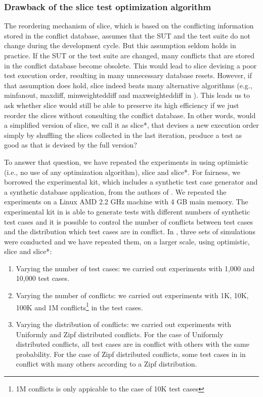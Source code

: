 \documentclass[authoryear,preprint,12pt]{elsarticle}
\begin{document}
  \subsubsection{Drawback of the {\sc slice} test optimization algorithm}
  \label{drawbackslice}

The reordering mechanism of {\sc slice}, which is based on the 
conflicting information stored in the conflict database, 
assumes that the SUT and the test suite do not change during the development cycle.
But this assumption seldom holds in practice.
If the SUT or the test suite are changed, 
many conflicts that are stored in the conflict database become obsolete.
This would lead to {\sc slice} devising a poor test execution order,
resulting in many unnecessary database resets.
However, if that assumption does hold,
{\sc slice} indeed beats many alternative algorithms (e.g., {\sc minfanout}, {\sc maxdiff}, {\sc minweighteddiff} and {\sc maxweighteddiff} in \cite{cidr05}).
This leads us to ask whether {\sc slice} would still be able to preserve its high efficiency if we just reorder the slices without consulting the conflict database.
In other words, 
would a simplified version of {\sc slice}, we call it as {\sc slice*},
that devises a new execution order simply by 
shuffling the slices collected in the last iteration,
produce a test as good as that is devised by the full version?

To answer that question, we have repeated the experiments in \cite{cidr05} using 
{\sc optimistic} (i.e., no use of any optimization algorithm), {\sc slice} and {\sc slice*}.
For fairness, we borrowed the experimental kit, which includes a synthetic test case generator and a synthetic database application, from the authors of \cite{cidr05}.
We repeated the experiments on a Linux AMD 2.2 GHz machine with 4 GB main memory.
The experimental kit in \cite{cidr05} is able to generate tests with 
different numbers of synthetic test cases and it is possible to control
the number of conflicts between test cases and the distribution which test cases are in conflict.
In \cite{cidr05}, three sets of simulations were conducted and we have repeated them, on a larger scale, using 
{\sc optimistic}, {\sc slice} and {\sc slice*}:

\begin{enumerate}
\item Varying the number of test cases:  we carried out experiments with 1,000 and 10,000 test cases.

\item Varying the number of conflicts:  we carried out experiments with 1K, 10K, 100K and 1M conflicts\footnote{1M conflicts is only appicable to the case of 10K test cases} in the test cases.

\item Varying the distribution of conflicts:  we carried out experiments with Uniformly and Zipf distributed conflicts.  For the case of 
Uniformly distributed conflicts, all test cases are in conflict with others with the same probability.  For the case of 
Zipf distributed conflicts, some test cases in in conflict with many others according to a Zipf distribution.
\end{enumerate}
\end{document}
